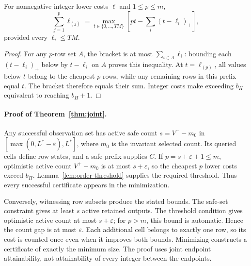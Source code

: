 \begin{lemma}
\label{lem:order-threshold}
For nonnegative integer lower costs $\ell$ and $1\le p\le m$,
\[
 \sum_{j=1}^{p}\ell_{(j)}=
 \max_{t\in\{0,\ldots,TM\}}\left[pt-\sum_i(t-\ell_i)_+\right],
\]
provided every $\ell_i\le TM$.
\end{lemma}
\begin{proof}
For any $p$-row set $A$, the bracket is at most $\sum_{i\in A}\ell_i$: bounding each $(t-\ell_i)_+$ below by $t-\ell_i$ on $A$ proves this inequality. At $t=\ell_{(p)}$, all values below $t$ belong to the cheapest $p$ rows, while any remaining rows in this prefix equal $t$. The bracket therefore equals their sum. Integer costs make exceeding $b_H$ equivalent to reaching $b_H+1$.
\end{proof}

\paragraph{Proof of Theorem~\ref{thm:joint}.}
Any successful observation set has active safe count $s=V^--m_0$ in $[\max(0,L^*-\varepsilon),L^*]$, where $m_0$ is the invariant selected count. Its queried cells define row states, and a safe prefix supplies $C$. If $p=s+\varepsilon+1\le m$, optimistic active count $V^+-m_0$ is at most $s+\varepsilon$, so the cheapest $p$ lower costs exceed $b_H$. Lemma~\ref{lem:order-threshold} supplies the required threshold. Thus every successful certificate appears in the minimization.

Conversely, witnessing row subsets produce the stated bounds. The safe-set constraint gives at least $s$ active retained outputs. The threshold condition gives optimistic active count at most $s+\varepsilon$; for $p>m$, this bound is automatic. Hence the count gap is at most $\varepsilon$. Each additional cell belongs to exactly one row, so its cost is counted once even when it improves both bounds. Minimizing constructs a certificate of exactly the minimum size. The proof uses joint endpoint attainability, not attainability of every integer between the endpoints.

